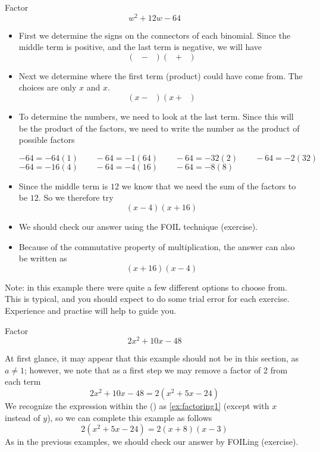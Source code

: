 \begin{myexample}
Factor
\[
	w^2+12w-64
\]
{}
\end{myexample}
\begin{myProof}
	\begin{itemize}
		\item First we determine the signs on the connectors of each binomial. Since
		the middle term is positive, and the last term is negative, we will have
		\[
			(\phantom{x}-\phantom{x})(\phantom{x}+\phantom{x})
		\]
		\item Next we determine where the first term (product) could have come from. 
		The choices are only $x$ and $x$. 
		\[
			(x-\phantom{x})(x+\phantom{x})
		\]
		\item To determine the numbers, we need to look at the last term. Since this will
		be the product of the factors, we need to write the number as the product of possible
		factors
		\begin{tightcenter}
			$-64=-64(1)\qquad -64=-1(64)\qquad -64=-32(2) \qquad -64 = -2(32) $\\
			$-64=-16(4)\qquad -64 = -4(16)\qquad -64 = -8(8)$
		\end{tightcenter}
		\item Since the middle term is $12$ we know that we need the sum of the factors to be $12$.
		So we therefore try
		\[
			(x-4)(x+16)
		\]
		\item We should check our answer using the FOIL technique (exercise).
		\item Because of the commutative property of multiplication, the answer can also be written as
		\[
			(x+16)(x-4)
		\]
	\end{itemize}
	Note: in this example there were quite a few different options to choose from. This is typical, and you 
	should expect to do some trial error for each exercise. Experience and practise will help to guide you.
\end{myProof}

\begin{myexample}
Factor
\[
	2x^2+10x-48
\]
{}
\end{myexample}
\begin{myProof}
	At first glance, it may appear that this example should not be in this section, as $a\ne 1$; however, we note
	that as a first step we may remove a factor of 2 from each term
	\[
		2x^2+10x-48 = 2(x^2+5x-24)
	\] 
	We recognize the expression within the () as \cref{ex:factoring1} (except with $x$ instead of $y$),
	so we can complete this example as follows
	\[
		2(x^2+5x-24)	=	2(x+8)(x-3)	
	\]
	As in the previous examples, we should check our answer by FOILing (exercise).
\end{myProof} 


